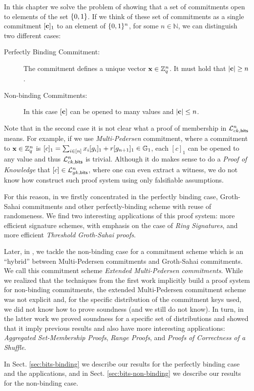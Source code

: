 In this chapter we solve the problem of showing that a set of commitments open to elements of the set $\{0,1\}$. If we think of these set of commitments as a single commitment $[\mathbf{c}]_1$ to an element of $\{0,1\}^n$, for some $n\in\mathbb{N}$, we can distinguish two different cases:

\begin{description}
\item[Perfectly Binding Commitment:] The commitment defines a unique vector $\mathbf{x}\in\mathbb{Z}_q^n$. It must hold that $|\mathbf{c}|\geq n$.
\item[Non-binding Commitments:] In this case $[\mathbf{c}]$ can be opened to many values and $|\mathbf{c}|\leq n$.
\end{description}

Note that in the second case it is not clear what a proof of membership in $\mathcal{L}_{ck,\mathsf{bits}}^n$ means. For example, if we use \emph{Multi-Pedersen} commitment, where a commitment to $\mathbf{x}\in\mathbb{Z}_q^n$ is $[c]_1=\sum_{i\in[n]}x_i[g_i]_1+r[g_{n+1}]_1\in\mathbb{G}_1$, each $[c]_1$ can be opened to any value and thus $\mathcal{L}_{ck,\mathsf{bits}}^n$ is trivial. Although it do makes sense to do a \emph{Proof of Knowledge} that $[c]\in\mathcal{L}_{gk,\mathsf{bits}}^n$, where one can even extract a witness, we do not know how construct such proof system using only falsifiable assumptions.

For this reason, in \cite{AC:GonHevRaf15} we firstly concentrated in the perfectly binding case, Groth-Sahai commitments and other perfectly-binding scheme with reuse of randomeness. We find two interesting applications of this proof system: more efficient signature schemes, with emphasis on the case of \emph{Ring Signatures}, and more efficient \emph{Threshold Groth-Sahai proofs}.
 
Later, in \cite{ACNS:GonRaf16}, we tackle the non-binding case for a commitment scheme which is an ``hybrid'' between Multi-Pedersen commitments and Groth-Sahai commitments. We call this commitment scheme \emph{Extended Multi-Pedersen commitments}. 
While we realized that the techniques from the first work implicitly build a proof system for non-binding commitments, the extended Multi-Pedersen commitment scheme was not explicit and, for the specific distribution of the commitment keys used, we did not know how to prove soundness (and we still do not know). In turn, in the latter work we proved soundness for a specific set of distributions and showed that it imply previous results and also have more interesting applications: \emph{Aggregated Set-Membership Proofs}, \emph{Range Proofs}, and \emph{Proofs of Correctness of a Shuffle}.

In Sect. \ref{sec:bits-binding} we describe our results for the perfectly binding case and the applications, and in Sect. \ref{sec:bits-non-binding} we describe our results for the non-binding case.
